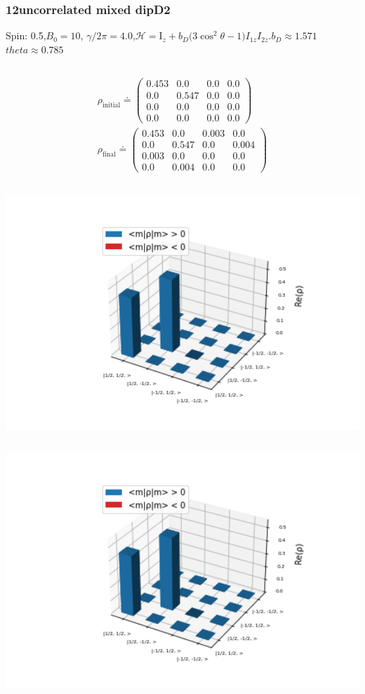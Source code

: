 \documentclass[10pt]{beamer}
\begin{document}
\begin{frame}
\frametitle{12uncorrelated mixed dipD2}
Spin: 0.5,$B_0= 10$, $\gamma/2\pi = 4.0$,$\mathcal{H}=\text{I}_{z}+ b_D \big(3\cos^2\theta-1\big)I_{1z}I_{2z}.$$b_D\approx1.571$$theta\approx0.785$
\begin{columns}[T]
\begin{column}{.5\textwidth}
\begin{align*}
\rho_{\text{initial}}\doteq
\begin{pmatrix}
0.453 & 0.0 & 0.0 & 0.0 \\
0.0 & 0.547 & 0.0 & 0.0 \\
0.0 & 0.0 & 0.0 & 0.0 \\
0.0 & 0.0 & 0.0 & 0.0
\end{pmatrix}
\\
\rho_{\text{final}}\doteq
\begin{pmatrix}
0.453 & 0.0 & 0.003 & 0.0 \\
0.0 & 0.547 & 0.0 & 0.004 \\
0.003 & 0.0 & 0.0 & 0.0 \\
0.0 & 0.004 & 0.0 & 0.0
\end{pmatrix}
\end{align*}
\begin{column}{.5\textwidth}
\includegraphics[width=1.5\textwidth]{./spin1-2/12uncorrelated_mixed_dipD2/InitialRealPartDensityMatrix.png}
\end{column}
\begin{column}{.5\textwidth}
\includegraphics[width=1.5\textwidth]{./spin1-2/12uncorrelated_mixed_dipD2/EvolvedRealPartDensityMatrix.png}

\end{column}
\end{column}
\end{columns}
\end{frame}
\end{document}
